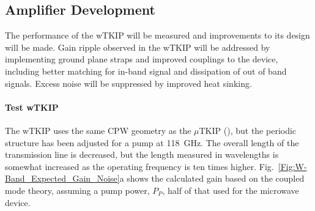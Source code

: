 \subsection*{Amplifier Development}
The performance of the wTKIP will be measured and improvements to its design will be made.  Gain ripple observed in the wTKIP will be addressed by implementing ground plane straps and improved couplings to the device, including better matching for in-band signal and dissipation of out of band signals.  Excess noise will be suppressed by improved heat sinking. 

\paragraph*{Test wTKIP}
The wTKIP uses the same CPW geometry as the $\mu$TKIP (\cite{Eom2012}), but the periodic structure has been adjusted for a pump at \SI{118}{GHz}. The overall length of the transmission line is decreased, but the length measured in wavelengths is somewhat increased as the operating frequency is ten times higher. Fig.~\ref{Fig:W-Band_Expected_Gain_Noise}a shows the calculated gain based on the coupled mode theory, assuming a pump power, $P_P$, half of that used for the microwave device.
